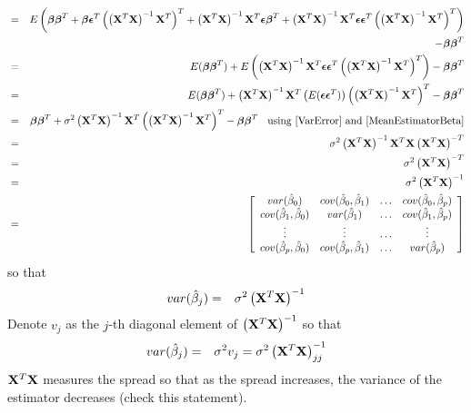 \documentclass[11pt]{article}
\theoremstyle{remark}
\begin{document}
\begin{eqnarray}
&=& E\left(\boldsymbol{\beta}\boldsymbol{\beta}^T  + \boldsymbol{\beta} \boldsymbol{\epsilon}^T\left(\left(\bold{X}^T\bold{X}\right)^{-1}\bold{X}^T\right)^T + \left(\bold{X}^T\bold{X}\right)^{-1}\bold{X}^T\boldsymbol{\epsilon}\boldsymbol{\beta}^T + \left(\bold{X}^T\bold{X}\right)^{-1}\bold{X}^T\boldsymbol{\epsilon}\boldsymbol{\epsilon}^T\left(\left(\bold{X}^T\bold{X}\right)^{-1}\bold{X}^T\right)^T\right) \nonumber\\
&& - \boldsymbol{\beta}\boldsymbol{\beta}^T\nonumber\\
&=& E(\boldsymbol{\beta}\boldsymbol{\beta}^T) + E\left(\left(\bold{X}^T\bold{X}\right)^{-1}\bold{X}^T\boldsymbol{\epsilon}\boldsymbol{\epsilon}^T\left(\left(\bold{X}^T\bold{X}\right)^{-1}\bold{X}^T\right)^T\right) - \boldsymbol{\beta}\boldsymbol{\beta}^T\nonumber\\
&=& E(\boldsymbol{\beta}\boldsymbol{\beta}^T) + \left(\bold{X}^T\bold{X}\right)^{-1}\bold{X}^T\left(E(\boldsymbol{\epsilon}\boldsymbol{\epsilon}^T)\right)\left(\left(\bold{X}^T\bold{X}\right)^{-1}\bold{X}^T\right)^T - \boldsymbol{\beta}\boldsymbol{\beta}^T\nonumber\\
&=& \boldsymbol{\beta}\boldsymbol{\beta}^T + \sigma^2 \left(\bold{X}^T\bold{X}\right)^{-1}\bold{X}^T\left(\left(\bold{X}^T\bold{X}\right)^{-1}\bold{X}^T\right)^T - \boldsymbol{\beta}\boldsymbol{\beta}^T\:\:\:\:\text{using \eqref{VarError} and \eqref{MeanEstimatorBeta}}\nonumber\\
&=& \sigma^2 \left(\bold{X}^T\bold{X}\right)^{-1}\bold{X}^T\bold{X}\left(\bold{X}^T\bold{X}\right)^{-T}\nonumber\\
&=& \sigma^2 \left(\bold{X}^T\bold{X}\right)^{-T}\nonumber\\
&=& \sigma^2 \left(\bold{X}^T\bold{X}\right)^{-1}\label{VarEstimator}\\
&=& 
\left[
\begin{array}{cccc}
var(\hat{\beta}_0) & cov(\hat{\beta}_0,\hat{\beta}_1) & \hdots & cov(\hat{\beta}_0,\hat{\beta}_{p})\\
cov(\hat{\beta}_1,\hat{\beta}_0) & var(\hat{\beta}_1) & \hdots & cov(\hat{\beta}_1,\hat{\beta}_{p})\\
\vdots & \vdots & \hdots & \vdots \\
cov(\hat{\beta}_p,\hat{\beta}_0) &  cov(\hat{\beta}_p,\hat{\beta}_1)& \hdots & var(\hat{\beta}_p)
\end{array} 
\right]
\label{VarEstimatorMatrixForm}
\end{eqnarray}
so that 
\begin{eqnarray}
var(\hat{\beta}_j)&=& \sigma^2 \left(\bold{X}^T\bold{X}\right)^{-1}
\end{eqnarray}
Denote $v_j$ as the $j$-th diagonal element of $\left(\bold{X}^T\bold{X}\right)^{-1}$ so that
\begin{eqnarray}
var(\hat{\beta}_j) &=& \sigma^2 v_j = \sigma^2 \left(\bold{X}^T\bold{X}\right)^{-1}_{jj}\label{VarianceEstimatorDiag}
\end{eqnarray}
$\bold{X}^T\bold{X}$ measures the spread so that as the spread increases, the variance of the estimator decreases (check this statement).
\end{document}
